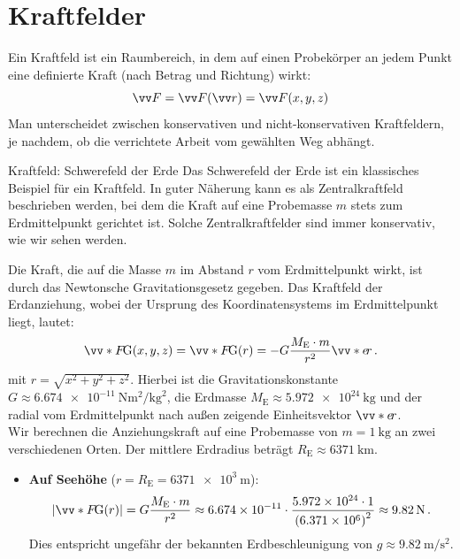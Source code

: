 \section{Kraftfelder}\label{sec: kraftfelder}
Ein Kraftfeld ist ein Raumbereich, in dem auf einen Probekörper an jedem Punkt eine definierte Kraft (nach Betrag und Richtung) wirkt: 
\begin{equation}
    \ivec{F} = \ivec{F}(\ivec{r}) = \ivec{F}(x,y,z)
\end{equation}Man unterscheidet zwischen konservativen und nicht-konservativen Kraftfeldern, je nachdem, ob die verrichtete Arbeit vom gewählten Weg abhängt.
\begin{examplebox}[breakable]{Kraftfeld: Schwerefeld der Erde}
Das Schwerefeld der Erde ist ein klassisches Beispiel für ein Kraftfeld. In guter Näherung kann es als Zentralkraftfeld beschrieben werden, bei dem die Kraft auf eine Probemasse $m$ stets zum Erdmittelpunkt gerichtet ist. Solche Zentralkraftfelder sind immer konservativ, wie wir sehen werden.

Die Kraft, die auf die Masse $m$ im Abstand $r$ vom Erdmittelpunkt wirkt, ist durch das Newtonsche Gravitationsgesetz gegeben. Das Kraftfeld der Erdanziehung, wobei der Ursprung des Koordinatensystems im Erdmittelpunkt liegt, lautet:
\begin{equation}\label{eq: gravitationsgesetz_erde}
    \ivecS{F}{\text{G}}(x,y,z) = \ivecS{F}{\text{G}}(r) = -G \frac{M_\text{E} \cdot m}{r^2} \ivecS{e}{r} \mDot
\end{equation}
mit $r = \sqrt{x^2 + y^2 + z^2}$. Hierbei ist die Gravitationskonstante $G \approx \SI{6.674e-11}{\newton\meter\squared\per\kilogram\squared}$, die Erdmasse $M_\text{E} \approx \SI{5.972e24}{\kilogram}$ und der radial vom Erdmittelpunkt nach außen zeigende Einheitsvektor $\ivecS{e}{r}$.\\

Wir berechnen die Anziehungskraft auf eine Probemasse von $m = \SI{1}{\kilo\gram}$ an zwei verschiedenen Orten. Der mittlere Erdradius beträgt $R_\text{E} \approx \SI{6371}{\kilo\meter}$.

\begin{itemize}[itemsep=1.5pt]
    \item \textbf{Auf Seehöhe} ($r = R_\text{E} = \SI{6371e3}{\meter}$):
    \begin{equation}
        |\ivecS{F}{\text{G}}(r)| = G \frac{M_\text{E} \cdot m}{r^2} \approx \num{6.674e-11} \cdot \frac{\num{5.972e24} \cdot \num{1}}{{(\num{6.371e6})}^2} \approx \SI{9.82}{\newton} \mDot
    \end{equation}
    Dies entspricht ungefähr der bekannten Erdbeschleunigung von $g \approx \SI{9.82}{\meter\per\second\squared}$.


\end{itemize}
\end{examplebox}
